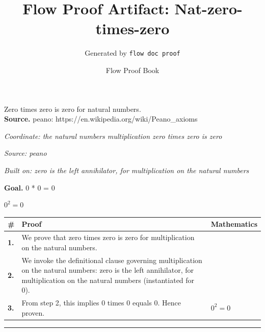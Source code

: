 \documentclass[11pt]{article}
\title{Flow Proof Artifact: Nat-zero-times-zero}
\author{Generated by \texttt{flow doc proof}}
\date{Flow Proof Book}
\theoremstyle{definition}
\begin{document}
\maketitle
Zero times zero is zero for natural numbers.\\[0.5em]
\textbf{Source.} peano: https://en.wikipedia.org/wiki/Peano\_axioms\\[0.5em]
\bigskip
{}\par
\smallskip\noindent\textit{Coordinate: the natural numbers \cdot multiplication \cdot zero times zero is zero}\par
\smallskip\noindent\textit{Source: peano}\par
\smallskip\noindent\textit{Built on: zero is the left annihilator, for multiplication on the natural numbers}\par
\medskip
\noindent\textbf{Goal.} 0 * 0 = 0\par
\noindent$\displaystyle 0^{2} = 0$\par
\medskip
\noindent
\begin{tabular}{@{} >{\raggedright\arraybackslash}p{} >{\raggedright\arraybackslash}p{} >{\raggedleft\arraybackslash}p{} @{}}
\textbf{\#} & \textbf{Proof} & \textbf{Mathematics} \\
\midrule
\textbf{1.} & We prove that zero times zero is zero for multiplication on the natural numbers. & \\[0.45em]
\textbf{2.} & We invoke the definitional clause governing multiplication on the natural numbers: zero is the left annihilator, for multiplication on the natural numbers (instantiated for 0). & \\[0.45em]
\textbf{3.} & From step 2, this implies 0 times 0 equals 0. Hence proven. & $\displaystyle 0^{2} = 0$ \\[0.45em]
\bottomrule
\end{tabular}
\label{thm:Nat-multiplication-zero_times_zero_is_zero}
\par\medskip\hrule
\end{document}
